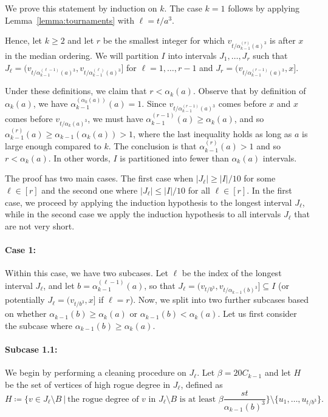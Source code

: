 \documentclass[a4paper,11pt]{article}
\makeatletter
\renewenvironment{proof}[1][\proofname] {\par\pushQED{\qed}\normalfont\topsep6\p@\@plus6\p@\relax\trivlist\item[\hskip\labelsep\bfseries#1\@addpunct{.}]\ignorespaces}{\popQED\endtrivlist\@endpefalse}
\theoremstyle{definition}
\makeatother
\begin{document}
\begin{proof}
We prove this statement by induction on $k$. The case $k=1$ follows by applying Lemma~\ref{lemma:tournaments} with $\ell=t/a^3$.

Hence, let $k\geq 2$ and let $r$ be the smallest integer for which $v_{t/\alpha_{k-1}^{(r)}(a)^3}$ is after $x$ in the median ordering. We will partition $I$ into intervals $J_1, \dots, J_{r}$ such that $J_\ell=(v_{t/\alpha_{k-1}^{(\ell-1)}(a)^3}, v_{t/\alpha_{k-1}^{(\ell)}(a)^3}]$ for $\ell=1, \dots, r-1$ and $J_r=(v_{t/\alpha_{k-1}^{(r-1)}(a)^3}, x]$. 

Under these definitions, we claim that $r< \alpha_k(a)$. Observe that by definition of $\alpha_k(a)$, we have $\alpha_{k-1}^{(\alpha_k(a))}(a)=1$. Since $v_{t/\alpha_{k-1}^{(r-1)}(a)^3}$ comes before $x$ and $x$ comes before $v_{t/\alpha_k(a)^3}$, we must have $\alpha_{k-1}^{(r-1)}(a)\geq \alpha_k(a)$, and so $\alpha_{k-1}^{(r)}(a)\geq \alpha_{k-1}(\alpha_k(a))>1$, where the last inequality holds as long as $a$ is large enough compared to $k$. The conclusion is that $\alpha_{k-1}^{(r)}(a)>1$ and so $r< \alpha_k(a)$. 
In other words, $I$ is partitioned into fewer than $\alpha_k(a)$ intervals. 


The proof has two main cases. The first case when $|J_\ell|\geq |I|/10$ for some $\ell\in [r]$ and the second one where $|J_\ell|\leq |I|/10$ for all $\ell\in [r]$. In the first case, we proceed by applying the induction hypothesis to the longest interval $J_{\ell}$, while in the second case we apply the induction hypothesis to all intervals $J_{\ell}$ that are not very short.

\paragraph{Case 1:} Within this case, we have two subcases. Let $\ell$ be the index of the longest interval $J_\ell$, and let $b=\alpha_{k-1}^{(\ell-1)}(a)$, so that $J_\ell=(v_{t/b^3}, v_{t/\alpha_{k-1}(b)^3}]\subseteq I$ (or potentially $J_\ell=(v_{t/b^3}, x]$ if $\ell=r$).
Now, we split into two further subcases based on whether $\alpha_{k-1}(b)\geq \alpha_k(a)$ or $\alpha_{k-1}(b)<\alpha_k(a)$. Let us first consider the subcase where $\alpha_{k-1}(b)\geq \alpha_k(a)$.

\paragraph{Subcase 1.1:}
We begin by performing a cleaning procedure on $J_\ell$. Let $\beta=20C_{k-1}$ and let $H$ be the set of vertices of high rogue degree in $J_\ell$, defined as 
\[H\coloneqq\Big\{v\in J_\ell\setminus B ~\Big|~ \text{the rogue degree of $v$ in $J_\ell\setminus B$ is at least $\beta \frac{st}{\alpha_{k-1}(b)^3}$}\Big\} \setminus \{u_1, \dots, u_{t/b^3}\}.\] 


\end{proof}
\end{document}
